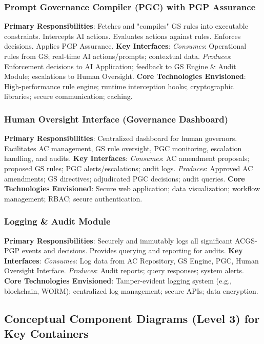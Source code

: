 \documentclass[sigconf,review,anonymous=false]{acmart} %
\begin{document}
\subsubsection{Prompt Governance Compiler (PGC) with PGP Assurance}
\label{app:architecture_details_pgc}
\textbf{Primary Responsibilities}: Fetches and "compiles" GS rules into executable constraints. Intercepts AI actions. Evaluates actions against rules. Enforces decisions. Applies PGP Assurance.
\textbf{Key Interfaces}:
    \textit{Consumes}: Operational rules from GS; real-time AI actions/prompts; contextual data.
    \textit{Produces}: Enforcement decisions to AI Application; feedback to GS Engine \& Audit Module; escalations to Human Oversight.
\textbf{Core Technologies Envisioned}: High-performance rule engine; runtime interception hooks; cryptographic libraries; secure communication; caching.

\subsubsection{Human Oversight Interface (Governance Dashboard)}
\label{app:architecture_details_ho_interface}
\textbf{Primary Responsibilities}: Centralized dashboard for human governors. Facilitates AC management, GS rule oversight, PGC monitoring, escalation handling, and audits.
\textbf{Key Interfaces}:
    \textit{Consumes}: AC amendment proposals; proposed GS rules; PGC alerts/escalations; audit logs.
    \textit{Produces}: Approved AC amendments; GS directives; adjudicated PGC decisions; audit queries.
\textbf{Core Technologies Envisioned}: Secure web application; data visualization; workflow management; RBAC; secure authentication.

\subsubsection{Logging \& Audit Module}
\label{app:architecture_details_log_audit}
\textbf{Primary Responsibilities}: Securely and immutably logs all significant ACGS-PGP events and decisions. Provides querying and reporting for audits.
\textbf{Key Interfaces}:
    \textit{Consumes}: Log data from AC Repository, GS Engine, PGC, Human Oversight Interface.
    \textit{Produces}: Audit reports; query responses; system alerts.
\textbf{Core Technologies Envisioned}: Tamper-evident logging system (e.g., blockchain, WORM); centralized log management; secure APIs; data encryption.


\subsection{Conceptual Component Diagrams (Level 3) for Key Containers}
\label{app:architecture_details_components}
\end{document}
